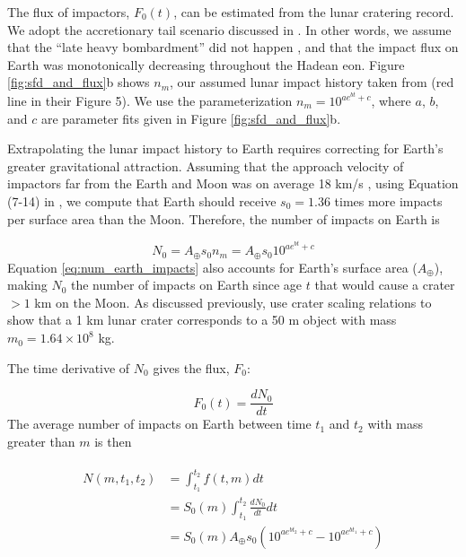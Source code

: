 \documentclass[manuscript]{aastex63}
\begin{document}
The flux of impactors, $F_0(t)$, can be estimated from the lunar cratering record. We adopt the accretionary tail scenario discussed in \citet{Morbidelli_2018}. In other words, we assume that the ``late heavy bombardment'' did not happen \citep{Cartwright_2022,Hartmann_2019,Zellner_2017}, and that the impact flux on Earth was monotonically decreasing throughout the Hadean eon. Figure \ref{fig:sfd_and_flux}b shows $n_m$, our assumed lunar impact history taken from \citet{Morbidelli_2018} (red line in their Figure 5). We use the parameterization $n_m = 10^{a e^{b t} + c}$, where $a$, $b$, and $c$ are parameter fits given in Figure \ref{fig:sfd_and_flux}b.

Extrapolating the lunar impact history to Earth requires correcting for Earth's greater gravitational attraction. Assuming that the approach velocity of impactors far from the Earth and Moon was on average 18 km/s \citep{Morbidelli_2018}, using Equation (7-14) in \citet{Zahnle_2006}, we compute that Earth should receive $s_0 = 1.36$ times more impacts per surface area than the Moon. Therefore, the number of impacts on Earth is

\begin{equation}
  N_0 = A_\oplus s_0 n_m = A_\oplus s_0 10^{a e^{b t} + c}
  \label{eq:num_earth_impacts}
\end{equation}
Equation \eqref{eq:num_earth_impacts} also accounts for Earth's surface area ($A_\oplus$), making $N_0$ the number of impacts on Earth since age $t$ that would cause a crater $> 1$ km on the Moon. As discussed previously, \citet{Morbidelli_2018} use crater scaling relations to show that a 1 km lunar crater corresponds to a 50 m object with mass $m_0 = 1.64 \times 10^8$ kg.

The time derivative of $N_0$ gives the flux, $F_0$:

\begin{equation}
  F_0(t) = \frac{d N_0}{dt}
\end{equation}
The average number of impacts on Earth between time $t_1$ and $t_2$ with mass greater than $m$ is then

\begin{align}
\begin{split}
  N(m,t_1,t_2) &= \int_{t_1}^{t_2} f(t,m) dt \\
  &= S_0(m) \int_{t_1}^{t_2} \frac{d N_0}{dt} dt \\
  &= S_0(m) A_\oplus s_0 \left( 10^{a e^{b t_2} + c} - 10^{a e^{b t_1} + c} \right)
\end{split}
\end{align}
\end{document}
